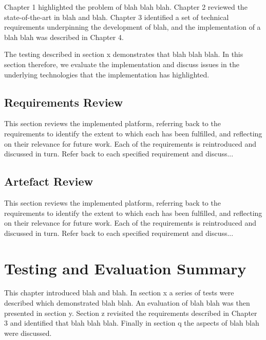 Chapter 1 highlighted the problem of blah blah blah. Chapter 2 reviewed the state-of-the-art in blah and blah.  Chapter 3 identified a set of technical requirements underpinning the development of blah, and the implementation of a blah blah was described in Chapter 4.

The testing described in section x demonstrates that blah blah blah. In this section therefore, we evaluate the implementation and discuss issues in the underlying technologies that the implementation has highlighted.

\subsection{Requirements Review} \label{s-i--requirements-review}

This section reviews the implemented platform, referring back to the requirements to identify the extent to which each has been fulfilled, and reflecting on their relevance for future work. Each of the requirements is reintroduced and discussed in turn.
Refer back to each specified requirement and discuss...


\subsection{Artefact Review} \label{s-i--artefact-review}

This section reviews the implemented platform, referring back to the requirements to identify the extent to which each has been fulfilled, and reflecting on their relevance for future work. Each of the requirements is reintroduced and discussed in turn.
Refer back to each specified requirement and discuss...

\section{Testing and Evaluation Summary} \label{s-i--testing-and-evaluation-summary}

This chapter introduced blah and blah.  In section x a series of tests were described which demonstrated blah blah.
An evaluation of blah blah was then presented in section y.  Section z revisited the requirements described in Chapter 3 and identified that blah blah blah. Finally in section q the aspects of blah blah were discussed.
